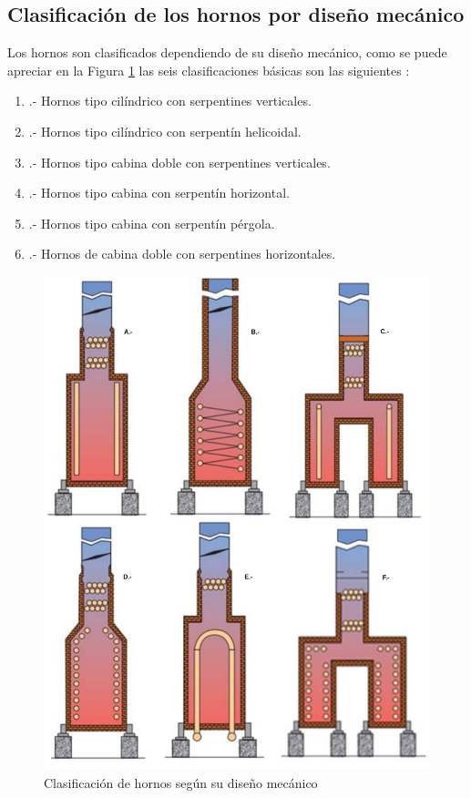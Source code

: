 \subsection{Clasificación de los hornos por diseño mecánico}
\par Los hornos son clasificados dependiendo de su diseño mecánico, como se puede apreciar en la Figura \ref{fig:hornos_tipos} las seis clasificaciones básicas son las siguientes \cite{pdvsa1}:
\begin{enumerate}[label=\Alph*]
    \item .-  Hornos tipo cilíndrico con serpentines verticales.
    \item .-  Hornos tipo cilíndrico con serpentín helicoidal.
    \item .-  Hornos tipo cabina doble con serpentines verticales.
    \item .-  Hornos tipo cabina con serpentín horizontal.
    \item .-  Hornos tipo cabina con serpentín pérgola.
    \item .-  Hornos de cabina doble con serpentines horizontales.
\end{enumerate}
\begin{figure}[hbt] \begin{center}
\includegraphics[scale=0.30]{images/hornos_tipos}
\caption[Tipos de hornos por diseño mecánico]{Clasificación de hornos según su diseño mecánico \cite{kumar}}
\label{fig:hornos_tipos}
\end{center} \end{figure}

